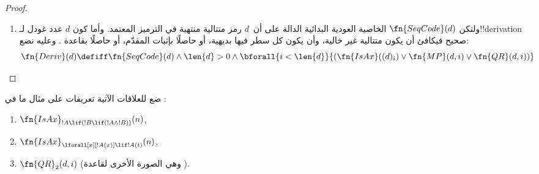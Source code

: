 \documentclass[../../../include/open-logic-section]{subfiles}
\begin{document}
\begin{proof}
\begin{enumerate}
\begin{enumerate}
  \item تكون جملة السطر $i$ هي $!B\lif\lforall[x][!A(x)]$،
  \item وتكون جملة سطر سابق $j<i$ هي $!B\lif\Subst{!A}{c}{x}$ لثابت~$c$
  \item يمتنع وروده في~$!B$.
  \end{enumerate}
  ولكل شرط من هذه الشروط اختبار عودي بدائي. وذلك أن أعداد غودل
  لـ$!B$ و$!A(x)$ و$x$ دون عدد غودل لصيغة السطر~$i$، وأن عدد
  غودل لـ$c$ دون عدد غودل لصيغة السطر~$j$:
  \begin{multline*}
    \fn{QR}_1(d, i) \defiff \bexists{j<i}{\bexists{b < (d)_i}{\bexists{x <
        (d)_i}{\bexists{a < (d)_i}{\bexists{c < (d)_j}{(}}}}}
    \\ \fn{Var}(x) \land \fn{Const}(c) \land {} \\
    (d)_i = \Gn{(} \concat
    b \concat \Gn{\lif} \concat \Gn{\lforall} \concat x \concat a
    \concat \Gn{)} \land {}\\
    (d)_j = \Gn{(} \concat b \concat
    \Gn{\lif} \concat \fn{Subst}(a,c,x) \concat \Gn{)} \land {}\\ \fn{Sent}(b)
    \land \fn{Sent}(\fn{Subst}(a,c,x)) \land {} \bforall{k <
      \len{b}}{(b)_k \neq (c)_0})
  \end{multline*}
  والمراد بـ$c$ و$x$ هنا عددا غودل للثابت والمتغير بوصف كل منهما حدًا،
  لا شفرتا الرمزين المفردين. فأما اختبار انحصار المتغيرات الحرة في $x$
  من~$!A(x)$، فبكون $\Subst{!A(x)}{c}{x}$ !!a{sentence}.
  وأما امتناع ورود $c$ في $!B$، فباشتراط أن يخالف كل رمز في~$!B$ الرمز~$c$.

  وتبقى الصورة الأخرى لقاعدة \QR{}، وقد جعلناها تمرينًا.
\item ولتكن $\fn{SeqCode}(d)$ الخاصية العودية البدائية الدالة على أن~$d$
  رمز متتالية منتهية في الترميز المعتمد. وأما كون $d$ عدد غودل
  لـ!!{derivation} صحيح فيكافئ أن يكون متتالية غير خالية، وأن يكون
  كل سطر فيها بديهية، أو حاصلًا بإثبات المقدّم، أو حاصلًا بقاعدة \QR.
  وعليه نضع:
  \[
  \fn{Deriv}(d) \defiff \fn{SeqCode}(d) \land \len{d}>0 \land
  \bforall{i < \len{d}}{(\fn{IsAx}((d)_i) \lor
    \fn{MP}(d,i) \lor \fn{QR}(d, i))}
  \]
\end{enumerate}
\end{proof}

\begin{prob}
ضع للعلاقات الآتية تعريفات على مثال ما في
:
\begin{enumerate}
\item $\fn{IsAx}_{!A \lif (!B \lif (!A \land !B))}(n)$,
\item $\fn{IsAx}_{\lforall[x][!A(x)] \lif !A(t)}(n)$,
\item $\fn{QR}_{2}(d, i)$ (وهي الصورة الأخرى لقاعدة \QR).
\end{enumerate}
\end{prob}
\end{document}

